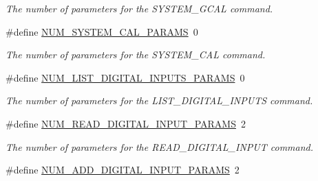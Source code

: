 \begin{DoxyCompactItemize}
\begin{DoxyCompactList}\small\item\em The number of parameters for the S\-Y\-S\-T\-E\-M\-\_\-\-G\-C\-A\-L command. \end{DoxyCompactList}\item 
\hypertarget{group__command__interpreter_gab61f2dda81ab965fb510863070474767}{\#define \hyperlink{group__command__interpreter_gab61f2dda81ab965fb510863070474767}{N\-U\-M\-\_\-\-S\-Y\-S\-T\-E\-M\-\_\-\-C\-A\-L\-\_\-\-P\-A\-R\-A\-M\-S}~0}\label{group__command__interpreter_gab61f2dda81ab965fb510863070474767}

\begin{DoxyCompactList}\small\item\em The number of parameters for the S\-Y\-S\-T\-E\-M\-\_\-\-C\-A\-L command. \end{DoxyCompactList}\item 
\hypertarget{group__command__interpreter_ga5ad550260c3e06471bddb5c3a8aaba04}{\#define \hyperlink{group__command__interpreter_ga5ad550260c3e06471bddb5c3a8aaba04}{N\-U\-M\-\_\-\-L\-I\-S\-T\-\_\-\-D\-I\-G\-I\-T\-A\-L\-\_\-\-I\-N\-P\-U\-T\-S\-\_\-\-P\-A\-R\-A\-M\-S}~0}\label{group__command__interpreter_ga5ad550260c3e06471bddb5c3a8aaba04}

\begin{DoxyCompactList}\small\item\em The number of parameters for the L\-I\-S\-T\-\_\-\-D\-I\-G\-I\-T\-A\-L\-\_\-\-I\-N\-P\-U\-T\-S command. \end{DoxyCompactList}\item 
\hypertarget{group__command__interpreter_gae9468d3d4d92a32a998fa97c0075db48}{\#define \hyperlink{group__command__interpreter_gae9468d3d4d92a32a998fa97c0075db48}{N\-U\-M\-\_\-\-R\-E\-A\-D\-\_\-\-D\-I\-G\-I\-T\-A\-L\-\_\-\-I\-N\-P\-U\-T\-\_\-\-P\-A\-R\-A\-M\-S}~2}\label{group__command__interpreter_gae9468d3d4d92a32a998fa97c0075db48}

\begin{DoxyCompactList}\small\item\em The number of parameters for the R\-E\-A\-D\-\_\-\-D\-I\-G\-I\-T\-A\-L\-\_\-\-I\-N\-P\-U\-T command. \end{DoxyCompactList}\item 
\hypertarget{group__command__interpreter_ga9c5c1af739a3a4edde8cdb7af7df1ec5}{\#define \hyperlink{group__command__interpreter_ga9c5c1af739a3a4edde8cdb7af7df1ec5}{N\-U\-M\-\_\-\-A\-D\-D\-\_\-\-D\-I\-G\-I\-T\-A\-L\-\_\-\-I\-N\-P\-U\-T\-\_\-\-P\-A\-R\-A\-M\-S}~2}\label{group__command__interpreter_ga9c5c1af739a3a4edde8cdb7af7df1ec5}


\end{DoxyCompactItemize}
